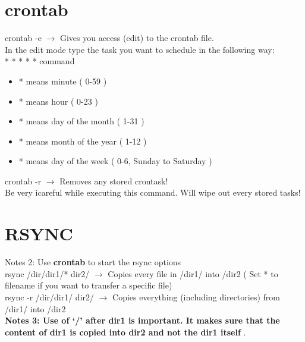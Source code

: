 \documentclass[twoside,a4paper]{article}
\newcommand{\tcb}{\color{blue}}
\newcommand{\tcc}{\color{cyan}}
\newcommand{\tcr}{\color{red}}
\newcommand{\tcg}{\color{gray}}
\newcommand{\tco}{\color{orange}}
\newcommand{\tcp}{\color{purple}}
\newcommand{\tck}{\color{black}}
\newcommand{\ra }{$\rightarrow$ }
\newcommand{\hs}{\hspace}
\begin{document}
\begin{multicols}{2}
\tcc \section{crontab}
	\hs{-0.5 cm}\tcr crontab \tcb  -e \tck 
	\ra Gives you access (edit) to the \tcr  crontab 
	\tck  file.\\
	In the edit mode type the task you want to schedule in the following 
	way:\\
	\tcr  \tcb  * \tcr  * \color{green} * 
	\color{magenta} * \tcg  * \tck  command 
	\tck 
	\begin{itemize}
		\item \tcb  * \tck  means minute ( 0-59 )
		\item \tcr   * \tck  means hour ( 0-23 )
		\item \color{green} * \tck  means day of the month
		( 1-31 )
		\item \color{magenta} * \tck  means month of the 
		year ( 1-12 )
		\item \tcg  * \tck  means day of the week
		( 0-6, Sunday to Saturday )
	\end{itemize}

	\hs{-0.7 cm} \tcr crontab \tcb  -r \tck 
	\ra Removes any stored crontask! \tcg \\
	Be very icareful while executing this command. Will wipe out every 
	stored tasks!

	\newpage

\tcc \section{RSYNC}

	\hs{-0.5cm}\tcg  Notes 2: Use \textbf{crontab} to start 
	the rsync options\\
	\hs{-0.5 cm}\tcr rsync \tcp /dir/dir1/* 
	\tco dir2/ \tck  \ra Copies every file in
	\tcp /dir1/ into \tco  /dir2 \tck ( Set *
	to filename if you want to transfer a specific file)\\
	\tcr rsync -r \tcp /dir/dir1/ \tco dir2/ 
	\tck  \ra Copies everything (including directories)
	from \tcp  /dir1/ \tck  into \tco /dir2
	\tck \\
	\tcg \textbf{Notes 3: Use of \textbf{`/'} after \textbf{dir1} is 
	important. It makes sure that the content of \textbf{dir1} is copied 
	into \textbf{dir2} and not the \textbf{dir1} itself }.\\


\end{multicols}
\end{document}
